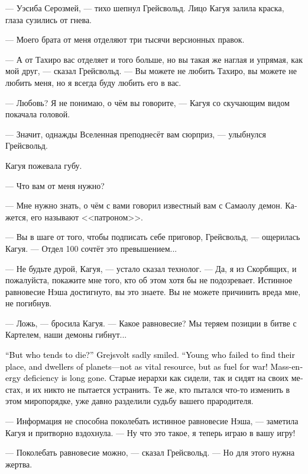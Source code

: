 \documentclass[a4paper,12pt,fleqn]{book}\usepackage{cooltooltips}\usepackage{polyglossia}\setdefaultlanguage[babelshorthands=true]{russian}\setotherlanguage{english}\defaultfontfeatures{Ligatures=TeX,Mapping=tex-text} \usepackage{xcolor}\definecolor{lightgray}{HTML}{bbbbbb}\color{lightgray}\newcommand{\ml}[3]{\textenglish{\textcolor{black}{#3}}}
\begin{document}
--- Уэсиба Серозмей, --- тихо шепнул Грейсвольд.
Лицо Кагуя залила краска, глаза сузились от гнева.

--- Моего брата от меня отделяют три тысячи версионных правок.

--- А от Тахиро вас отделяет и того больше, но вы такая же наглая и упрямая, как мой друг, --- сказал Грейсвольд.
--- Вы можете не любить Тахиро, вы можете не любить меня, но я всегда буду любить его в вас.

--- Любовь?
Я не понимаю, о чём вы говорите, --- Кагуя со скучающим видом покачала головой.

--- Значит, однажды Вселенная преподнесёт вам сюрприз, --- улыбнулся Грейсвольд.

Кагуя пожевала губу.

--- Что вам от меня нужно?

--- Мне нужно знать, о чём с вами говорил известный вам с Самаолу демон.
Кажется, его называют <<патроном>>.

--- Вы в шаге от того, чтобы подписать себе приговор, Грейсвольд, --- ощерилась Кагуя.
--- Отдел 100 сочтёт это превышением...

--- Не будьте дурой, Кагуя, --- устало сказал технолог.
--- Да, я из Скорбящих, и пожалуйста, покажите мне того, кто об этом хотя бы не подозревает.
Истинное равновесие Нэша достигнуто, вы это знаете.
Вы не можете причинить вреда мне, не погибнув.

--- Ложь, --- бросила Кагуя.
--- Какое равновесие?
Мы теряем позиции в битве с Картелем, наши демоны гибнут...

\ml{$0$}
{--- Кто гибнет? --- грустно улыбнулся Грейсвольд.}
{``But who tends to die?'' Grejsvolt sadly smiled.}
\ml{$0$}
{--- Молодёжь, не нашедшая своего места, жители планет, которые уже даже не ресурс для выживания, а топливо для войны!}
{``Young who failed to find their place, and dwellers of planets---not as vital resource, but as fuel for war!}
\ml{$0$}
{Дефицита масс-энергии давно нет.}
{Mass-energy deficiency is long gone.}
Старые иерархи как сидели, так и сидят на своих местах, и их никто не пытается устранить.
Те же, кто пытался что-то изменить в этом миропорядке, уже давно разделили судьбу вашего прародителя.

--- Информация не способна поколебать истинное равновесие Нэша, --- заметила Кагуя и притворно вздохнула.
--- Ну что это такое, я теперь играю в вашу игру!

--- Поколебать равновесие можно, --- сказал Грейсвольд.
--- Но для этого нужна жертва.
\end{document}
